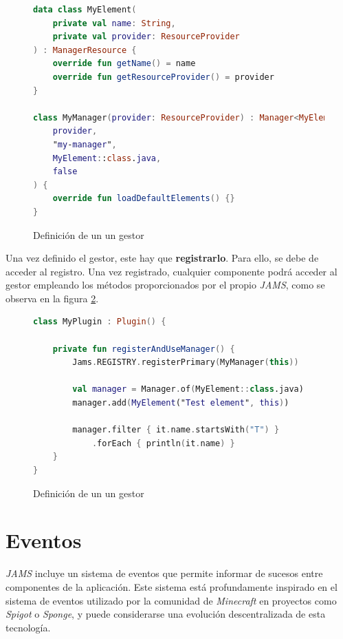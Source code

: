 \begin{figure}[h]
    \centering
    \begin{lstlisting}[frame=single,label={lst:manager-definition},language=Kotlin]
data class MyElement(
    private val name: String,
    private val provider: ResourceProvider
) : ManagerResource {
    override fun getName() = name
    override fun getResourceProvider() = provider
}

class MyManager(provider: ResourceProvider) : Manager<MyElement>(
    provider,
    "my-manager",
    MyElement::class.java,
    false
) {
    override fun loadDefaultElements() {}
}
    \end{lstlisting}
    \caption{Definición de un un gestor}
    \label{fig:manager-definition}
\end{figure}

Una vez definido el gestor, este hay que \textbf{registrarlo}.
Para ello, se debe de acceder al registro.
Una vez registrado, cualquier componente podrá acceder al
gestor empleando los métodos proporcionados por el propio \textit{JAMS},
como se observa en la figura \ref{fig:manager-use}.

\begin{figure}[h]
    \centering
    \begin{lstlisting}[frame=single,label={lst:manager-use},language=Kotlin]
class MyPlugin : Plugin() {

    private fun registerAndUseManager() {
        Jams.REGISTRY.registerPrimary(MyManager(this))

        val manager = Manager.of(MyElement::class.java)
        manager.add(MyElement("Test element", this))

        manager.filter { it.name.startsWith("T") }
            .forEach { println(it.name) }
    }
}
    \end{lstlisting}
    \caption{Definición de un un gestor}
    \label{fig:manager-use}
\end{figure}


\section{Eventos}\label{sec:eventos}

\textit{JAMS} incluye un sistema de eventos que permite informar
de sucesos entre componentes de la aplicación.
Este sistema está profundamente inspirado en el sistema de eventos
utilizado por la comunidad de \textit{Minecraft}
en proyectos como \textit{Spigot}\cite{SPIGOT}
o \textit{Sponge}\cite{SPONGE}, y puede considerarse una evolución descentralizada
de esta tecnología.

